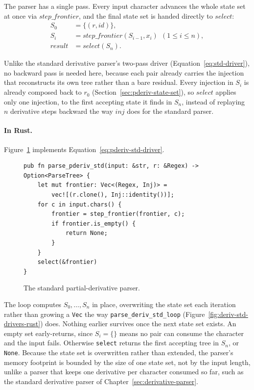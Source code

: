 The parser has a single pass.
Every input character advances the whole state set at once 
via $\mathit{step\_frontier}$, 
and the final state set is handed directly to $\mathit{select}$:
\begin{equation}\label{eq:pderiv-std-driver}
\begin{aligned}
S_0 &= \{(r, \mathit{id})\}, \\[10pt]
S_i &= \mathit{step\_frontier}(S_{i-1}, x_i)\ \ (1 \leq i \leq n), \\[10pt]
\mathit{result} &= \mathit{select}(S_n).
\end{aligned}
\end{equation}

Unlike the standard derivative parser's two-pass driver
(Equation~\eqref{eq:std-driver}),
no backward pass is needed here,
because each pair already carries the injection that reconstructs
its own tree rather than a bare residual.
Every injection in $S_i$ is already composed back to $r_0$
(Section~\ref{sec:pderiv-state-set}),
so $\mathit{select}$ applies only one injection,
to the first accepting state it finds in $S_n$,
instead of replaying $n$ derivative steps backward
the way $\mathit{inj}$ does for the standard parser.

%

\paragraph{In Rust.}
Figure~\ref{fig:pderiv-std-parser-rust} implements Equation~\eqref{eq:pderiv-std-driver}.
\begin{figure}[H]
\small
\begin{verbatim}
pub fn parse_pderiv_std(input: &str, r: &Regex) -> Option<ParseTree> {
    let mut frontier: Vec<(Regex, Inj)> =
        vec![(r.clone(), Inj::identity())];
    for c in input.chars() {
        frontier = step_frontier(frontier, c);
        if frontier.is_empty() {
            return None;
        }
    }
    select(&frontier)
}
\end{verbatim}
\caption{The standard partial-derivative parser.}
\label{fig:pderiv-std-parser-rust}
\end{figure}

The loop computes $S_0, \ldots, S_n$ in place, 
overwriting the state set each iteration 
rather than growing a \texttt{Vec} the way \texttt{parse\_deriv\_std\_loop} 
(Figure~\ref{fig:deriv-std-drivers-rust}) does. 
Nothing earlier survives once the next state set exists. 
An empty set early-returns, 
since $S_i = \{\}$ means no pair can consume the character and the input fails. 
Otherwise \texttt{select} returns the first accepting tree in $S_n$, or \texttt{None}.
Because the state set is overwritten rather than extended,
the parser's memory footprint is bounded by the size of one state set,
not by the input length, unlike a parser that keeps one derivative
per character consumed so far, such as the standard derivative
parser of Chapter~\ref{sec:derivative-parser}.

